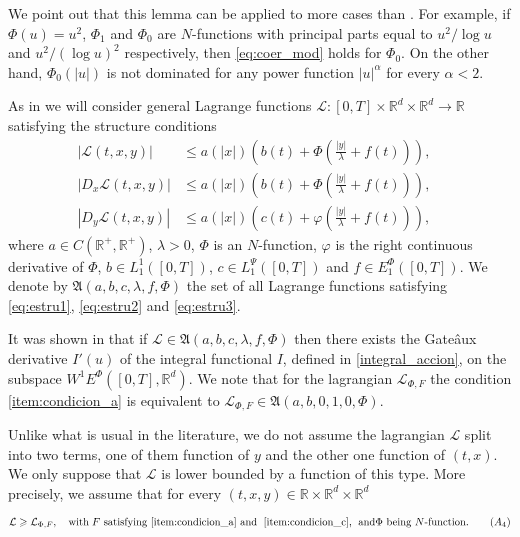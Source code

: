 \documentclass[twoside]{article}
\theoremstyle{remark}
\newcommand{\lpsi}{L^{\Psi}}
\newcommand{\ephi}{E^{\Phi}}
\newcommand{\wphie}{W^{1}\ephi}
\newcommand{\rr}{\mathbb{R}}
\renewcommand{\leq}{\leqslant}
\renewcommand{\geq}{\geqslant}
\newcounter{example}
\begin{document}
 We point out that this lemma can be applied to more cases than \cite[Lemma 5.2]{ABGMS2015}. For example, if $\Phi(u)=u^2$, $\Phi_1$ and $\Phi_0$ are  $N$-functions with principal parts equal to $u^2/\log u$ and $u^2/(\log u)^2$ respectively, then  \eqref{eq:coer_mod} holds for $\Phi_0$. On the other hand, $\Phi_0(|u|)$ is not dominated for any  power function $|u|^{\alpha}$ for every $\alpha<2$.




As in  \cite{ABGMS2015} we will consider general Lagrange functions
$\mathcal{L}:[0,T]\times\rr^d\times\rr^d\to\rr$
satisfying the structure conditions
\begin{align}
|\mathcal{L}(t,x,y)| &\leq a(|x|)\left(b(t)+ \Phi\left(\frac{|y|}{\lambda}+f(t) \right)\right),&\tag{$A_1$}\label{eq:estru1}
\\
|D_{x}\mathcal{L}(t,x,y)| &\leq a(|x|)\left(b(t)+ \Phi\left(\frac{|y|}{\lambda}+f(t) \right)\right),&\tag{$A_2$}\label{eq:estru2}
\\
|D_{y}\mathcal{L}(t,x,y)| &\leq a(|x|)\left(c(t)+ \varphi\left(\frac{|y|}{\lambda}+f(t)\right)\right),
&\tag{$A_3$}\label{eq:estru3}
\end{align}
where $a\in C(\mathbb{R}^+,\mathbb{R}^+)$, $\lambda>0$, $\Phi$ is an $N$-function,
$\varphi$ is the right continuous derivative of $\Phi$,
$b\in L^1_1([0,T])$,  $c\in\lpsi_1([0,T])$ and  $f\in \ephi_1([0,T])$. We denote by $\mathfrak{A}(a,b,c,\lambda,f,\Phi)$ the set of all Lagrange functions satisfying  \eqref{eq:estru1}, \eqref{eq:estru2} and \eqref{eq:estru3}.




It was shown in
\cite{ABGMS2015} that if $\mathcal{L}\in \mathfrak{A}(a,b,c,\lambda,f,\Phi)$ then there  exists the Gate\^aux derivative $I'(u)$ of the integral functional $I$, defined in \eqref{integral_accion}, on the subspace $\wphie([0,T],\rr^d)$. We note that for the lagrangian $\mathcal{L}_{\Phi,F}$ the condition \ref{item:condicion_a} is equivalent to
$\mathcal{L}_{\Phi,F}\in \mathfrak{A}(a,b,0,1,0,\Phi)$.

 Unlike what is usual in the literature, we do not assume the lagrangian $\mathcal{L}$  split into two terms, 
one of them function of $y$ and the other one function of $(t,x)$. 
We only suppose that $\mathcal{L}$ is lower bounded by a function of this type. More precisely, we assume that for every $(t,x,y)\in\rr\times\rr^d\times\rr^d$

\begin{equation}\label{eq:control_inf}
\mathcal{L} \geq \mathcal{L}_{\Phi,F},\quad \text{with}\;F\text{ satisfying \ref{item:condicion_a} and\; \ref{item:condicion_c},  
\;\text{and}$\Phi$ being $N$-function}.\tag{$A_4$}
\end{equation}
\end{document}
